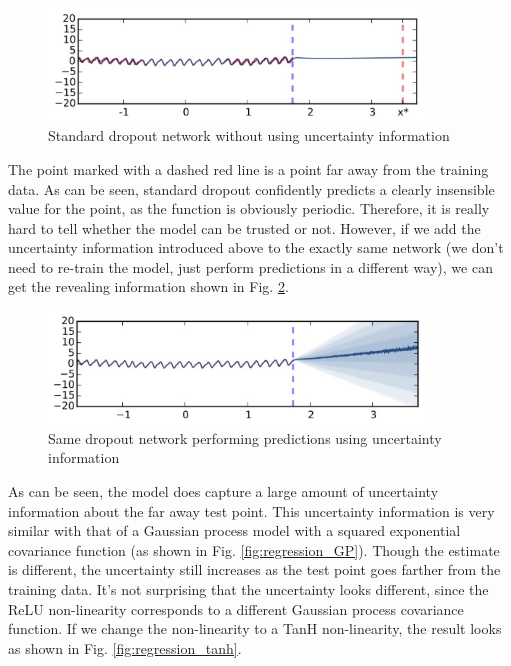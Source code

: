 \begin{figure}[H]
    \centering
    \includegraphics[width=10cm]{figs/Regression without uncertainty.png}
    \caption{Standard dropout network without using uncertainty information}
    \label{fig:regression_without_uncertainty}
\end{figure}

The point marked with a dashed red line is a point far away from the training data. As can be seen, standard dropout confidently predicts a clearly insensible value for the point, as the function is obviously periodic. Therefore, it is really hard to tell whether the model can be trusted or not. However, if we add the uncertainty information introduced above to the exactly same network (we don't need to re-train the model, just perform predictions in a different way), we can get the revealing information shown in Fig. \ref{fig:regression_with_uncertainty}.

\begin{figure}[H]
    \centering
    \includegraphics[width=10cm]{figs/Regression with uncertainty.png}
    \caption{Same dropout network performing predictions using uncertainty information}
    \label{fig:regression_with_uncertainty}
\end{figure}

As can be seen, the model does capture a large amount of uncertainty information about the far away test point. This uncertainty information is very similar with that of a Gaussian process model with a squared exponential covariance function (as shown in Fig. \ref{fig:regression_GP}). Though the estimate is different, the uncertainty still increases as the test point goes farther from the training data. It's not surprising that the uncertainty looks different, since the ReLU non-linearity corresponds to a different Gaussian process covariance function. If we change the non-linearity to a TanH non-linearity, the result looks as shown in Fig. \ref{fig:regression_tanh}.

